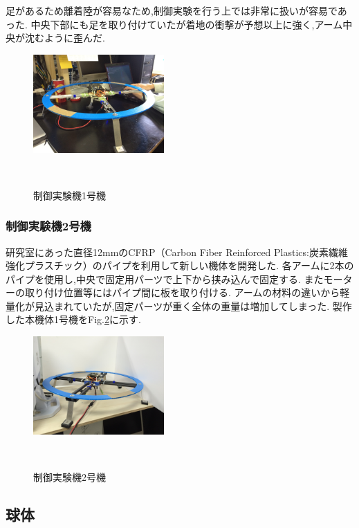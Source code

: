 \documentclass[a4paper]{jarticle}
\begin{document}
足があるため離着陸が容易なため,制御実験を行う上では非常に扱いが容易であった.
中央下部にも足を取り付けていたが着地の衝撃が予想以上に強く,アーム中央が沈むように歪んだ.

\begin{figure}[htbp]
 \begin{center}
  \includegraphics[width=50mm]{image/test-machine-1.JPG}
 　\caption{制御実験機1号機}
 　\label{fig:test-machine-1}
 \end{center}
\end{figure}

\subsubsection{制御実験機2号機}
研究室にあった直径12mmのCFRP（Carbon Fiber Reinforced Plastics:炭素繊維強化プラスチック）のパイプを利用して新しい機体を開発した.
各アームに2本のパイプを使用し,中央で固定用パーツで上下から挟み込んで固定する.
またモーターの取り付け位置等にはパイプ間に板を取り付ける.
アームの材料の違いから軽量化が見込まれていたが,固定パーツが重く全体の重量は増加してしまった.
製作した本機体1号機をFig.\ref{fig:test-machine-2}に示す.

\begin{figure}[htbp]
 \begin{center}
  \includegraphics[width=50mm]{image/test-machine-2.JPG}
 　\caption{制御実験機2号機}
 　\label{fig:test-machine-2}
 \end{center}
\end{figure}

\subsection{球体}
\end{document}
